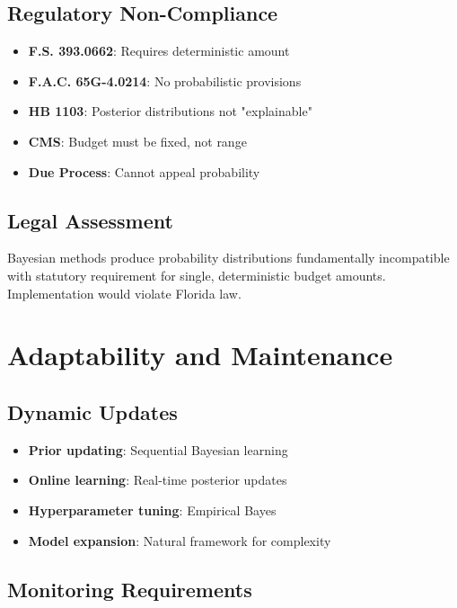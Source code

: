 \subsection{Regulatory Non-Compliance}

\begin{itemize}
    \item \textbf{F.S. 393.0662}: Requires deterministic amount
    \item \textbf{F.A.C. 65G-4.0214}: No probabilistic provisions
    \item \textbf{HB 1103}: Posterior distributions not "explainable"
    \item \textbf{CMS}: Budget must be fixed, not range
    \item \textbf{Due Process}: Cannot appeal probability
\end{itemize}

\subsection{Legal Assessment}

Bayesian methods produce probability distributions fundamentally incompatible with statutory requirement for single, deterministic budget amounts. Implementation would violate Florida law.

\section{Adaptability and Maintenance}

\subsection{Dynamic Updates}

\begin{itemize}
    \item \textbf{Prior updating}: Sequential Bayesian learning
    \item \textbf{Online learning}: Real-time posterior updates
    \item \textbf{Hyperparameter tuning}: Empirical Bayes
    \item \textbf{Model expansion}: Natural framework for complexity
\end{itemize}

\subsection{Monitoring Requirements}


